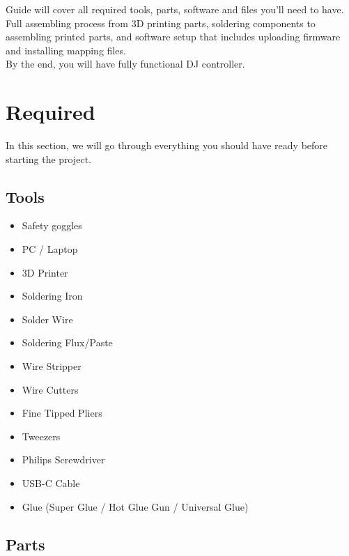 \documentclass[12pt, a4paper]{article}
\begin{document}
		\noindent Guide will cover all required tools, parts, software and files you'll need to have. Full assembling process from 3D printing parts, soldering components to assembling printed parts, and software setup that includes uploading firmware and installing mapping files. \\
		
		\noindent By the end, you will have fully functional DJ controller. \\
		
		\vfill
	
		\newpage
	
	
	\section{Required}
	
		\noindent In this section, we will go through everything you should have ready before starting the project.
		
		
		\subsection{Tools}
			
			\begin{itemize}
				\item Safety goggles
				\item PC / Laptop
				\item 3D Printer
				\item Soldering Iron
				\item Solder Wire
				\item Soldering Flux/Paste
				\item Wire Stripper
				\item Wire Cutters
				\item Fine Tipped Pliers
				\item Tweezers
				\item Philips Screwdriver
				\item USB-C Cable
				\item Glue (Super Glue / Hot Glue Gun / Universal Glue)
			\end{itemize}
			
			\vfill
			
	
		\subsection{Parts}
			
\end{document}
